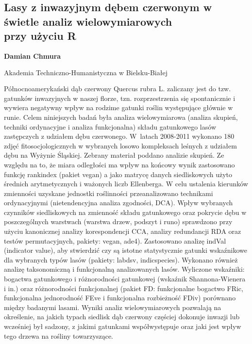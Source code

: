 \documentclass[\main/boa.tex]{subfiles}
\begin{document}
\subsection{Lasy z inwazyjnym dębem czerwonym w świetle analiz wielowymiarowych \\ przy użyciu R }

\begin{minipage}{0.915\textwidth}
	\centering
  {\bf {} Damian Chmura }
\end{minipage}


\begin{affiliations}
\begin{minipage}{0.915\textwidth}
\centering
Akademia Techniczno-Humanistyczna w Bielsku-Białej  \\[-2pt]
\end{minipage}
\end{affiliations}

\vskip 0.3cm

 Północnoamerykański dąb czerwony Quercus rubra L. zaliczany jest do tzw. gatunków inwazyjnych w naszej florze, tzn. rozprzestrzenia się spontanicznie i wywiera negatywny wpływ na rodzime gatunki roślin występujące głównie w runie. Celem niniejszych badań była analiza wielowymiarowa (analiza skupień, techniki ordynacyjne i analiza funkcjonalna) składu gatunkowego lasów zastępczych z udziałem dębu czerwonego. W~latach 2008-2011 wykonano 180 zdjęć fitosocjologicznych w wybranych losowo kompleksach leśnych z udziałem dębu na Wyżynie Śląskiej. Zebrany materiał poddano analizie skupień. Ze względu na to, że miara odległości ma wpływ na końcowy wynik zastosowano funkcję rankindex (pakiet vegan) a jako matrycę danych siedliskowych użyto średnich arytmetycznych i ważonych liczb Ellenberga. W celu ustalenia kierunków zmienności uzyskane jednostki roślinności przeanalizowano technikami ordynacyjnymi (nietendencyjna analiza zgodności, DCA). Wpływ wybranych czynników siedliskowych na zmienność składu gatunkowego oraz pokrycie dębu w poszczególnych warstwach (warstwa drzew, podszyt i runo) sprawdzono przy użyciu kanonicznej analizy korespondencji CCA, analizy redundancji RDA oraz testów permutacyjnych, pakiety: vegan, ade4). Zastosowano analizę indVal (indicator value), aby stwierdzić czy są istotne statystycznie gatunki wskaźnikowe dla wybranych typów lasów (pakiety: labdsv, indicspecies). Wykonano również analizę taksonomiczną i funkcjonalną analizowanych lasów. Wyliczone wskaźniki: bogactwa gatunkowego i różnorodności gatunkowej \break (wskaźnik Shannona-Wienera i in.) oraz różnorodności funkcjonalnej (pakiet FD: funkcjonalne bogactwo FRic, funkcjonalna jednorodność FEve i funkcjonalna rozbieżność FDiv) porównano między badanymi lasami. Wyniki analiz wielowymiarowych pozwalają na określenie, na jakich typach siedlisk dąb czerwony częściej dokonuje inwazji lub wcześniej był sadzony, z jakimi gatunkami współwystępuje oraz jaki jest wpływ tego drzewa na rośliny towarzyszące. 
\end{document}
